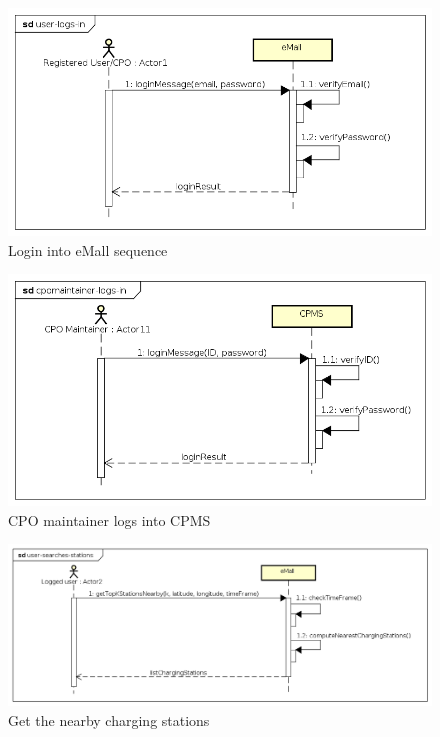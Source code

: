 \begin{figure}[!h]
    \begin{center}
        \includegraphics[keepaspectratio, width=16cm]{Sequence/user-logs-in.png}
        \caption{Login into \ac{eMall} sequence}
    \end{center}
\end{figure}
\begin{figure}[!h]
    \begin{center}
        \includegraphics[keepaspectratio, width=16cm]{Sequence/cpomaintainer-logs-in.png}
        \caption{\ac{CPO} maintainer logs into \ac{CPMS}}
    \end{center}
\end{figure}
\begin{figure}[!h]
    \begin{center}
        \includegraphics[keepaspectratio, width=16cm]{Sequence/user-searches-stations.png}
        \caption{Get the nearby charging stations}
    \end{center}
\end{figure}
